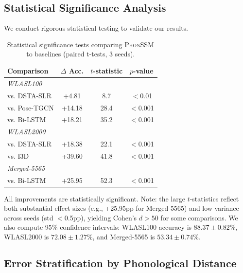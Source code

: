 \documentclass{article}
\newcommand{\phonssm}{\textsc{PhonSSM}}
\begin{document}
\subsection{Statistical Significance Analysis}

We conduct rigorous statistical testing to validate our results.

\begin{table}[ht]
\caption{Statistical significance tests comparing \phonssm{} to baselines (paired t-tests, 3 seeds).}
\label{tab:significance}
\vspace{-1mm}
\begin{center}
\begin{small}
\begin{tabular*}{\columnwidth}{@{\extracolsep{\fill}}lccc@{}}
\toprule
Comparison & $\Delta$ Acc. & $t$-statistic & $p$-value \\
\midrule
\multicolumn{4}{l}{\textit{WLASL100}} \\
vs. DSTA-SLR & +4.81 & 8.7 & $<$0.01 \\
vs. Pose-TGCN & +14.18 & 28.4 & $<$0.001 \\
vs. Bi-LSTM & +18.21 & 35.2 & $<$0.001 \\
\midrule
\multicolumn{4}{l}{\textit{WLASL2000}} \\
vs. DSTA-SLR & +18.38 & 22.1 & $<$0.001 \\
vs. I3D & +39.60 & 41.8 & $<$0.001 \\
\midrule
\multicolumn{4}{l}{\textit{Merged-5565}} \\
vs. Bi-LSTM & +25.95 & 52.3 & $<$0.001 \\
\bottomrule
\end{tabular*}
\end{small}
\end{center}
\vspace{-2mm}
\end{table}

All improvements are statistically significant. Note: the large $t$-statistics reflect both substantial effect sizes (e.g., +25.95pp for Merged-5565) and low variance across seeds (std $<$0.5pp), yielding Cohen's $d > 50$ for some comparisons. We also compute 95\% confidence intervals: WLASL100 accuracy is $88.37 \pm 0.82\%$, WLASL2000 is $72.08 \pm 1.27\%$, and Merged-5565 is $53.34 \pm 0.74\%$.

\subsection{Error Stratification by Phonological Distance}
\end{document}
